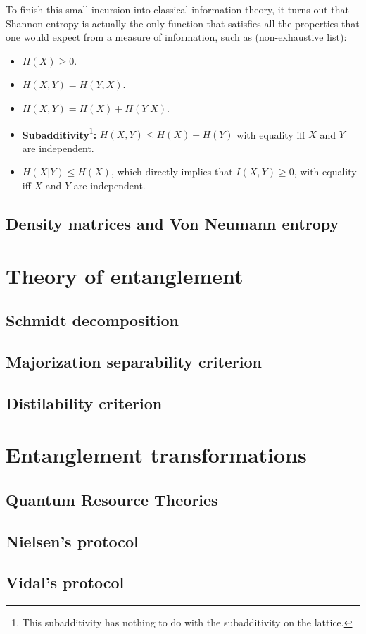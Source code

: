 To finish this small incursion into classical information theory, it turns out that Shannon entropy is actually the only function that satisfies all the properties that one would expect from a measure of information, such as (non-exhaustive list):

\begin{itemize}
    \item $H(X) \geq 0$.
    \item $H(X, Y) = H(Y, X)$.
    \item $H(X, Y) = H(X) + H(Y|X)$.
    \item \textbf{Subadditivity}\footnote{This subadditivity has nothing to do with the subadditivity on the lattice.}\textbf{:} $H(X, Y) \leq H(X) + H(Y)$ with equality iff $X$ and $Y$ are independent.
    \item $H(X|Y) \leq H(X)$, which directly implies that $I(X, Y) \geq 0$, with equality iff $X$ and $Y$ are independent.
\end{itemize}


\subsection{Density matrices and Von Neumann entropy}



\section{Theory of entanglement}

\subsection{Schmidt decomposition}

\subsection{Majorization separability criterion}



\subsection{Distilability criterion}



\section{Entanglement transformations}

\subsection{Quantum Resource Theories} \label{sec:QRT}



\subsection{Nielsen's protocol} \label{sec:nielsen}



\subsection{Vidal's protocol}


